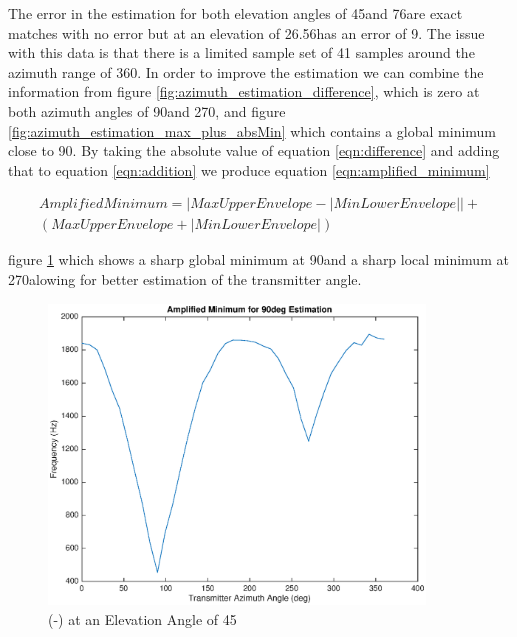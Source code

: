 The error in the estimation for both elevation angles of 45\textdegree \space and 76\textdegree \space are exact matches with no error but at an elevation of 26.56\textdegree \space has an error of 9\textdegree. The issue with this data is that there is a limited sample set of 41 samples around the azimuth range of 360\textdegree. In order to improve the estimation we can combine the information from figure \ref{fig:azimuth_estimation_difference}, which is zero at both azimuth angles of 90\textdegree \space and 270\textdegree, and figure \ref{fig:azimuth_estimation_max_plus_absMin} which contains a global minimum close to 90\textdegree. By taking the absolute value of equation \ref{eqn:difference} and adding that to equation \ref{eqn:addition} we produce equation \ref{eqn:amplified_minimum}

\begin{multline}
	 Amplified Minimum = | Max Upper Envelope - | Min Lower Envelope | | + \\ (Max Upper Envelope + | Min Lower Envelope |)
	 \label{eqn:amplified_minimum}
\end{multline}


figure \ref{fig:amplified_azimuth_estimation} which shows a sharp global minimum at 90\textdegree \space and a sharp local minimum at 270\textdegree alowing for better estimation of the transmitter angle.

  \begin{figure}
	\begin{center}
		\includegraphics[width=10cm]{images/results/Amplified_azimuth_angle_estimation_45deg.eps}
		\caption{ (-) at an Elevation Angle of 45\textdegree}
		\label{fig:amplified_azimuth_estimation}
	\end{center}
\end{figure}

